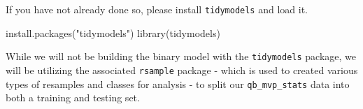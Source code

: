 \documentclass[
  letterpaper,
]{krantz}
\newenvironment{Shaded}{\begin{snugshade}}{\end{snugshade}}
\newcommand{\FunctionTok}[1]{\textcolor[rgb]{0.28,0.35,0.67}{#1}}
\newcommand{\NormalTok}[1]{\textcolor[rgb]{0.00,0.23,0.31}{#1}}
\newcommand{\StringTok}[1]{\textcolor[rgb]{0.13,0.47,0.30}{#1}}
\begin{document}
\begin{tcolorbox}[enhanced jigsaw, colback=white, leftrule=.75mm, breakable, colframe=quarto-callout-important-color-frame, bottomtitle=1mm, rightrule=.15mm, left=2mm, opacityback=0, bottomrule=.15mm, arc=.35mm, coltitle=black, colbacktitle=quarto-callout-important-color!10!white, toptitle=1mm, titlerule=0mm, title=\textcolor{quarto-callout-important-color}{\faExclamation}\hspace{0.5em}{Important}, toprule=.15mm, opacitybacktitle=0.6]

If you have not already done so, please install \texttt{tidymodels} and
load it.

\begin{Shaded}
\begin{Highlighting}[]
\FunctionTok{install.packages}\NormalTok{(}\StringTok{"tidymodels"}\NormalTok{)}
\FunctionTok{library}\NormalTok{(tidymodels)}
\end{Highlighting}
\end{Shaded}

\end{tcolorbox}

While we will not be building the binary model with the
\texttt{tidymodels} package, we will be utilizing the associated
\texttt{rsample} package - which is used to created various types of
resamples and classes for analysis - to split our
\texttt{qb\_mvp\_stats} data into both a training and testing set.
\end{document}
